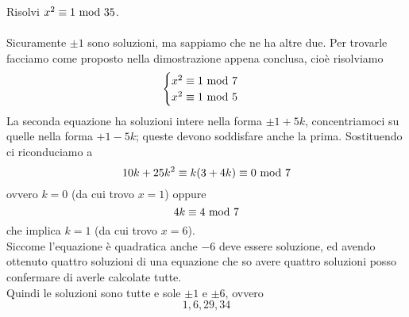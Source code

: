 \begin{esercizio}
	Risolvi $x^2\equiv1\ \mathrm{mod}\ 35$.\\ \\ Sicuramente $\pm1$ sono soluzioni, ma sappiamo che ne ha altre due. Per trovarle facciamo come proposto nella dimostrazione appena conclusa, cioè risolviamo
	\begin{equation*}
	\begin{cases}
	x^2\equiv1\ \mathrm{mod}\ 7\\
	x^2\equiv1\ \mathrm{mod}\ 5
	\end{cases}
	\end{equation*}
	La seconda equazione ha soluzioni intere nella forma $\pm1+5k$, concentriamoci su quelle nella forma $+1-5k$; queste devono soddisfare anche la prima. Sostituendo ci riconduciamo a 
	\begin{equation*}
	10k+25k^2\equiv k(3+4k)\equiv0\ \mathrm{mod}\ 7
	\end{equation*}
	ovvero $k=0$ (da cui trovo $x=1$) oppure 
	\begin{equation*}
	4k\equiv4\ \mathrm{mod}\ 7
	\end{equation*}
	che implica $k=1$ (da cui trovo $x=6$). \\ Siccome l'equazione è quadratica anche $-6$ deve essere soluzione, ed avendo ottenuto quattro soluzioni di una equazione che so avere quattro soluzioni posso confermare di averle calcolate tutte. \\ Quindi le soluzioni sono tutte e sole $\pm1$ e $\pm6$, ovvero 
	\begin{equation*}
	1,6,29,34
	\end{equation*}
\end{esercizio}
